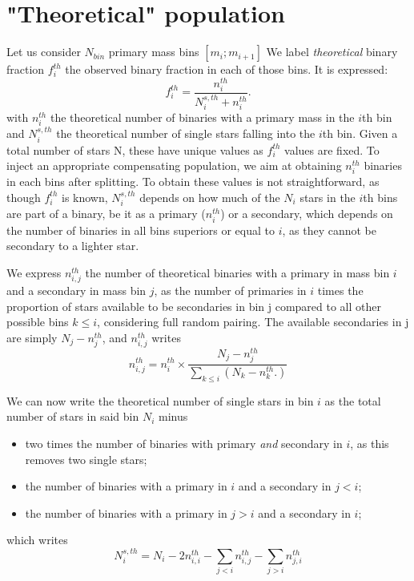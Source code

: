\section{"Theoretical" population}
\label{Sec:B_theoretical}

Let us consider $N_{bin}$ primary mass bins $[m_i ; m_{i+1}]$ We label \textit{theoretical} binary fraction  $f_i^{th}$ the observed binary fraction in each of those bins. It is expressed:
\begin{equation}
\label{Eq:B_thfraction}
f_i^{th} = \frac{n_i^{th}}{N_i^{s,th} + n_i^{th}}.
\end{equation}
with $n_i^{th}$ the theoretical number of binaries with a primary mass in the $i$th bin and $N_i^{s,th}$ the theoretical number of single stars falling into the $i$th bin. Given a total number of stars N, these have unique values as $f_i^{th}$ values are fixed. To inject an appropriate compensating population, we aim at obtaining $n_i^{th}$ binaries in each bins after splitting. To obtain these values is not straightforward, as though $f_i^{th}$ is known, $N_i^{s,th}$ depends on how much of the $N_i$ stars in the $i$th bins are part of a binary, be it as a primary ($n_i^{th}$) or a secondary, which depends on the number of binaries in all bins superiors or equal to $i$, as they cannot be secondary to a lighter star.

We express $n_{i,j}^{th}$ the number of theoretical binaries with a primary in mass bin $i$ and a secondary in mass bin $j$, as the number of primaries in $i$ times the proportion of stars available to be secondaries in bin j compared to all other possible bins $k\le i$, considering full random pairing. The available secondaries in j are simply $N_j - n_j^{th}$, and $n_{i,j}^{th}$ writes
\begin{equation}
n_{i,j}^{th} = n_i^{th} \times \frac{N_j - n_j^{th} }{\sum\limits_{k\le i} \left( N_k - n_k^{th}. \right) }
\end{equation}

We can now write the theoretical number of single stars in bin $i$ as the total number of stars in said bin $N_i$ minus
\begin{itemize}
\item two times the number of binaries with primary \textit{and} secondary in $i$, as this removes two single stars;
\item the number of binaries with a primary in $i$ and a secondary in $j<i$;
\item the number of binaries with a primary in $j>i$ and a secondary in $i$;
\end{itemize}
which writes
\begin{equation}
N_i^{s,th} = N_i - 2  n_{i,i}^{th} - \sum\limits_{j<i} n_{i,j}^{th} - \sum\limits_{j>i} n_{j,i}^{th}
\end{equation}

